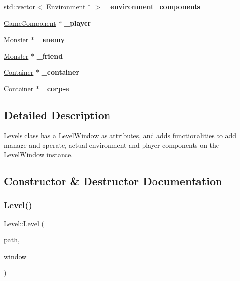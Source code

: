 \begin{DoxyCompactItemize}
std\+::vector$<$ \hyperlink{class_environment}{Environment} $\ast$ $>$ {\bfseries \+\_\+environment\+\_\+components}
\item 
\hypertarget{class_level_a0dd008af41c9a3ca0779bbaf3856e5e5}{}\label{class_level_a0dd008af41c9a3ca0779bbaf3856e5e5} 
\hyperlink{class_game_component}{Game\+Component} $\ast$ {\bfseries \+\_\+player}
\item 
\hypertarget{class_level_ad7db6f5c2cb8559da37f567219e8e22b}{}\label{class_level_ad7db6f5c2cb8559da37f567219e8e22b} 
\hyperlink{class_monster}{Monster} $\ast$ {\bfseries \+\_\+enemy}
\item 
\hypertarget{class_level_a10ab3150ddeb876097c011f2744c1466}{}\label{class_level_a10ab3150ddeb876097c011f2744c1466} 
\hyperlink{class_monster}{Monster} $\ast$ {\bfseries \+\_\+friend}
\item 
\hypertarget{class_level_a04250fd0b458eef2ea45fffc03c26455}{}\label{class_level_a04250fd0b458eef2ea45fffc03c26455} 
\hyperlink{class_container}{Container} $\ast$ {\bfseries \+\_\+container}
\item 
\hypertarget{class_level_a1187bd4f8ac20aa051409ac8067db564}{}\label{class_level_a1187bd4f8ac20aa051409ac8067db564} 
\hyperlink{class_container}{Container} $\ast$ {\bfseries \+\_\+corpse}
\end{DoxyCompactItemize}


\subsection{Detailed Description}
Levels class has a \hyperlink{class_level_window}{Level\+Window} as attributes, and adds functionalities to add manage and operate, actual environment and player components on the \hyperlink{class_level_window}{Level\+Window} instance. 

\subsection{Constructor \& Destructor Documentation}
\hypertarget{class_level_aba4f031f3752773a8a04bf58997776b9}{}\label{class_level_aba4f031f3752773a8a04bf58997776b9} 
\subsubsection{\texorpdfstring{Level()}{Level()}}
{\footnotesize\ttfamily Level\+::\+Level (\begin{DoxyParamCaption}\item[{std\+::string}]{path,  }\item[{\hyperlink{class_level_window}{Level\+Window} $\ast$}]{window }\end{DoxyParamCaption})}

